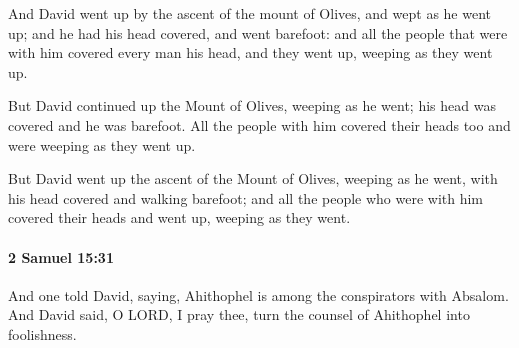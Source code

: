 			\begin{versebox}
					\item[BHS] 
					\item[ASV] And David went up by the ascent of the mount of Olives, and wept as he went up; and he had his head covered, and went barefoot: and all the people that were with him covered every man his head, and they went up, weeping as they went up.
					\item[NIV] But David continued up the Mount of Olives, weeping as he went; his head was covered and he was barefoot. All the people with him covered their heads too and were weeping as they went up.
					\item[NRSV] But David went up the ascent of the Mount of Olives, weeping as he went, with his head covered and walking barefoot; and all the people who were with him covered their heads and went up, weeping as they went.
			\end{versebox}

		\paragraph{2 Samuel 15:31} %
			\label{2SAMUEL-15-31}

			And one told David, saying, Ahithophel is among the conspirators with Absalom. And David said, O LORD, I pray thee, turn the counsel of Ahithophel into foolishness.

